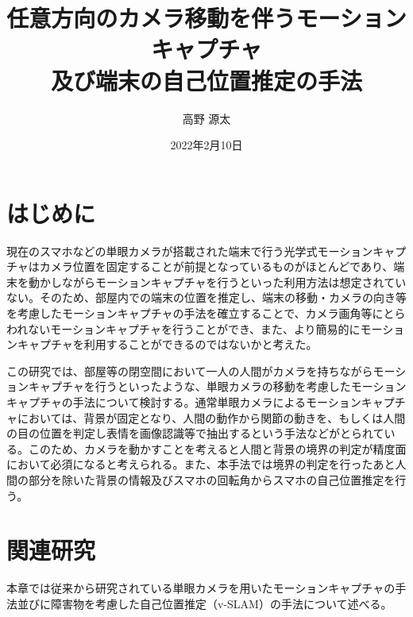 \documentclass[11pt]{jreport}
\title{任意方向のカメラ移動を伴うモーションキャプチャ \\
        及び端末の自己位置推定の手法}
\author{高野 源太}
\date{2022年2月10日}	%
\begin{document}
\maketitle

\begin{abstract}


\end{abstract}

\tableofcontents



\newpage
{}	%



\chapter{はじめに}
現在のスマホなどの単眼カメラが搭載された端末で行う光学式モーションキャプチャはカメラ位置を固定することが前提となっているものがほとんどであり、端末を動かしながらモーションキャプチャを行うといった利用方法は想定されていない。そのため、部屋内での端末の位置を推定し、端末の移動・カメラの向き等を考慮したモーションキャプチャの手法を確立することで、カメラ画角等にとらわれないモーションキャプチャを行うことができ、また、より簡易的にモーションキャプチャを利用することができるのではないかと考えた。

この研究では、部屋等の閉空間において一人の人間がカメラを持ちながらモーションキャプチャを行うといったような、単眼カメラの移動を考慮したモーションキャプチャの手法について検討する。通常単眼カメラによるモーションキャプチャにおいては、背景が固定となり、人間の動作から関節の動きを、もしくは人間の目の位置を判定し表情を画像認識等で抽出するという手法などがとられている。このため、カメラを動かすことを考えると人間と背景の境界の判定が精度面において必須になると考えられる。また、本手法では境界の判定を行ったあと人間の部分を除いた背景の情報及びスマホの回転角からスマホの自己位置推定を行う。

\chapter{関連研究}
本章では従来から研究されている単眼カメラを用いたモーションキャプチャの手法並びに障害物を考慮した自己位置推定（v-SLAM）の手法について述べる。
\end{document}
